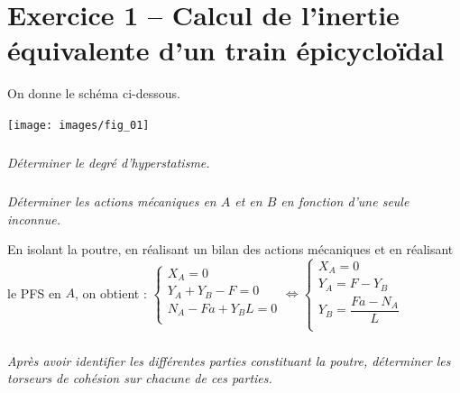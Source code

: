 \documentclass[10pt,fleqn]{article} %
\begin{document}

\vspace{10cm}
\pagestyle{fancy}
\thispagestyle{plain}


\def\columnseprulecolor{\color{ocre}}
\setlength{\columnseprule}{0.4pt} 


\section*{Exercice 1 -- Calcul de l'inertie équivalente d'un train épicycloïdal}
\setcounter{subparagraph}{0}
On donne le schéma ci-dessous.
\begin{center}
\texttt{[image: images/fig\_01]}
\end{center}

\subparagraph{}
\textit{Déterminer le degré d'hyperstatisme.}

\subparagraph{}
\textit{Déterminer les actions mécaniques en $A$ et en $B$ en fonction d'une seule inconnue.}


\ifprof
\begin{corrige}
En isolant la poutre, en réalisant un bilan des actions mécaniques et en réalisant le PFS en $A$, on obtient : 
$
\left\{
\begin{array}{l}
X_A  = 0 \\
Y_A  +Y_B - F= 0 \\
N_A-Fa+Y_B L = 0 \\
\end{array}
\right.
\Leftrightarrow
\left\{
\begin{array}{l}
X_A = 0 \\
Y_A = F-Y_B \\
Y_B = \dfrac{Fa - N_A}{L} \\
\end{array}
\right.
$

\end{corrige}
\else
\fi



\subparagraph{}
\textit{Après avoir identifier les différentes parties constituant la poutre, déterminer les torseurs de cohésion sur chacune de ces parties.}
\end{document}
